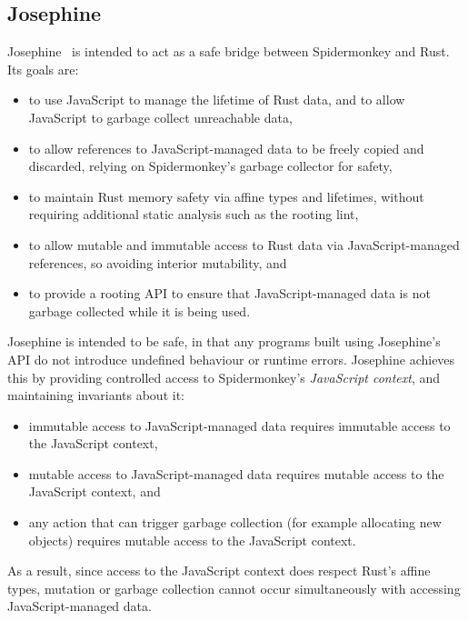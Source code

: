 \subsection{Josephine}

Josephine~\cite{josephine} is intended to act as a safe bridge between
Spidermonkey and Rust. Its goals are:
\begin{itemize}

\item to use JavaScript to manage the lifetime of Rust data,
  and to allow JavaScript to garbage collect unreachable data,

\item to allow references to JavaScript-managed data to be freely copied and discarded,
  relying on Spidermonkey's garbage collector for safety,

\item to maintain Rust memory safety via affine types and lifetimes,
  without requiring additional static analysis such as the rooting lint,

\item to allow mutable and immutable access to Rust data via JavaScript-managed references,
  so avoiding interior mutability, and

\item to provide a rooting API to ensure that JavaScript-managed data is not garbage collected
  while it is being used.

\end{itemize}
Josephine is intended to be safe, in that any programs built using Josephine's API
do not introduce undefined behaviour or runtime errors.
Josephine achieves this by providing controlled access to
Spidermonkey's \emph{JavaScript context}, and maintaining invariants about it:
\begin{itemize}

\item immutable access to JavaScript-managed data requires immutable access
  to the JavaScript context,

\item mutable access to JavaScript-managed data requires mutable access
  to the JavaScript context, and

\item any action that can trigger garbage collection (for example allocating
  new objects) requires mutable access to the JavaScript context.

\end{itemize}
As a result, since access to the JavaScript context does respect
Rust's affine types, mutation or garbage collection cannot occur
simultaneously with accessing JavaScript-managed data.

